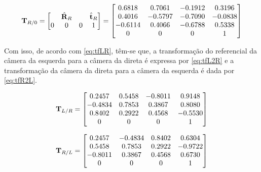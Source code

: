 \begin{equation}\label{eq:TR}
 	\mathbf{T}_{R/0} = \begin{bmatrix}
 		& \hat{\mathbf{R}}_R & & \hat{\mathbf{t}}_R\\
 		0 & 0 & 0 & 1
 	\end{bmatrix} = \begin{bmatrix}
 	0.6818  &  0.7061 &  -0.1912 & 0.3196  \\
 	0.4016  & -0.5797 &  -0.7090 & -0.0838 \\
 	-0.6114 &  0.4066 &  -0.6788 & 0.5338  \\
 	0       &  0      &   0      & 1
 \end{bmatrix}
\end{equation} 


Com isso, de acordo com \eqref{eq:tfLR}, têm-se que, a transformação do referencial da câmera da esquerda para a câmera da direta é expressa por \eqref{eq:tfL2R} e a transformação da câmera da direta para a câmera da esquerda é dada por \eqref{eq:tfR2L}.

\begin{equation}\label{eq:tfL2R}
	\mathbf{T}_{L/R} = \begin{bmatrix}
		0.2457  &  0.5458  & -0.8011 &   0.9148 \\
		-0.4834 &  0.7853  &  0.3867 &   0.8080 \\
		0.8402  &  0.2922  &  0.4568 &  -0.5530 \\
		0       &  0       &  0      &   1
	\end{bmatrix}
\end{equation}

\begin{equation}\label{eq:tfR2L}
	\mathbf{T}_{R/L} = \begin{bmatrix}
		0.2457  &  -0.4834 &  0.8402  &  0.6304 \\
		0.5458  &  0.7853  &  0.2922  & -0.9722 \\
		-0.8011 &  0.3867  &  0.4568  &  0.6730 \\
		0       &  0       &  0       &  1
	\end{bmatrix}
\end{equation}
